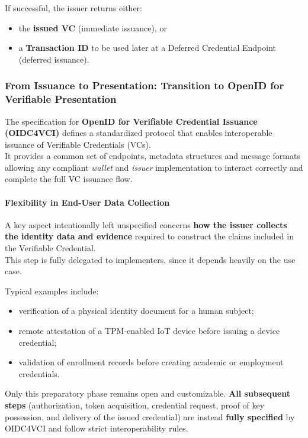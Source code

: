 \noindent
If successful, the issuer returns either:
\begin{itemize}
    \item the \textbf{issued VC} (immediate issuance), or
    \item a \textbf{Transaction ID} to be used later at a Deferred Credential Endpoint (deferred issuance).
\end{itemize}


\subsubsection*{From Issuance to Presentation: Transition to OpenID for Verifiable Presentation}

The specification for \textbf{OpenID for Verifiable Credential Issuance (OIDC4VCI)}
defines a standardized protocol that enables interoperable issuance of Verifiable Credentials (VCs).\\ 
It provides a common set of endpoints, metadata structures and message formats
allowing any compliant \emph{wallet} and \emph{issuer} implementation to interact
correctly and complete the full VC issuance flow.

\paragraph{Flexibility in End-User Data Collection}
A key aspect intentionally left unspecified concerns \textbf{how the issuer collects
the identity data and evidence} required to construct the claims included in the Verifiable Credential. \\
This step is fully delegated to implementers, since it depends heavily on the use case.

\noindent
Typical examples include:
\begin{itemize}
    \item verification of a physical identity document for a human subject;
    \item remote attestation of a TPM-enabled IoT device before issuing a device credential;
    \item validation of enrollment records before creating academic or employment credentials.
\end{itemize}

\noindent
Only this preparatory phase remains open and customizable.  
\textbf{All subsequent steps} (authorization, token acquisition, credential request, proof of key possession, and delivery of the issued credential) are instead \textbf{fully specified} by OIDC4VCI and follow strict interoperability rules.

